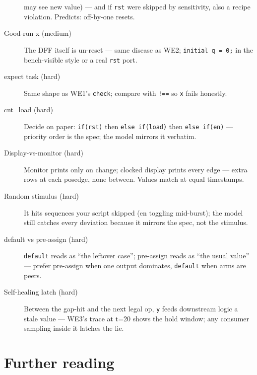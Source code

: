 \begin{description}
may see new value) --- and if \texttt{rst} were skipped by
sensitivity, also a recipe violation. Predicts: off-by-one resets.
\item[Good-run x (medium)] The DFF itself is un-reset --- same
disease as WE2; \texttt{initial q = 0;} in the bench-visible style or
a real \texttt{rst} port.
\item[expect task (hard)] Same shape as WE1's \texttt{check};
compare with \texttt{!==} so \texttt{x} fails honestly.
\item[cnt\_load (hard)] Decide on paper: \texttt{if(rst)} then
\texttt{else if(load)} then \texttt{else if(en)} --- priority order
is the spec; the model mirrors it verbatim.
\item[Display-vs-monitor (hard)] Monitor prints only on change;
clocked display prints every edge --- extra rows at each posedge,
none between. Values match at equal timestamps.
\item[Random stimulus (hard)] It hits sequences your script skipped
(en toggling mid-burst); the model still catches every deviation
because it mirrors the spec, not the stimulus.
\item[default vs pre-assign (hard)] \texttt{default} reads as
``the leftover case''; pre-assign reads as ``the usual value'' ---
prefer pre-assign when one output dominates, \texttt{default} when
arms are peers.
\item[Self-healing latch (hard)] Between the gap-hit and the next
legal op, \texttt{y} feeds downstream logic a stale value --- WE3's
trace at t=20 shows the hold window; any consumer sampling inside it
latches the lie.
\end{description}

\section*{Further reading}


